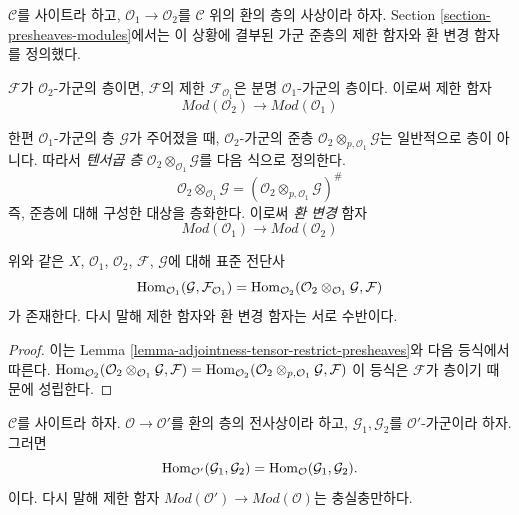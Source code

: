 \noindent
$\mathcal{C}$를 사이트라 하고, $\mathcal{O}_1 \to \mathcal{O}_2$를
$\mathcal{C}$ 위의 환의 층의 사상이라 하자. Section
\ref{section-presheaves-modules}에서는 이 상황에 결부된 가군 준층의 제한
함자와 환 변경 함자를 정의했다.

\medskip\noindent
$\mathcal{F}$가 $\mathcal{O}_2$-가군의 층이면, $\mathcal{F}$의 제한
$\mathcal{F}_{\mathcal{O}_1}$은 분명 $\mathcal{O}_1$-가군의 층이다.
이로써 제한 함자
$$
\textit{Mod}(\mathcal{O}_2)
\longrightarrow
\textit{Mod}(\mathcal{O}_1)
$$

\medskip\noindent
한편 $\mathcal{O}_1$-가군의 층 $\mathcal{G}$가 주어졌을 때,
$\mathcal{O}_2$-가군의 준층
$\mathcal{O}_2 \otimes_{p, \mathcal{O}_1} \mathcal{G}$는 일반적으로 층이
아니다. 따라서 {\it 텐서곱 층}
$\mathcal{O}_2 \otimes_{\mathcal{O}_1} \mathcal{G}$를 다음 식으로 정의한다.
$$
\mathcal{O}_2 \otimes_{\mathcal{O}_1} \mathcal{G}
=
(\mathcal{O}_2 \otimes_{p, \mathcal{O}_1} \mathcal{G})^\#
$$
즉, 준층에 대해 구성한 대상을 층화한다. 이로써 {\it 환 변경} 함자
$$
\textit{Mod}(\mathcal{O}_1)
\longrightarrow
\textit{Mod}(\mathcal{O}_2)
$$

\begin{lemma}
\label{lemma-adjointness-tensor-restrict}
위와 같은 $X$, $\mathcal{O}_1$, $\mathcal{O}_2$, $\mathcal{F}$,
$\mathcal{G}$에 대해 표준 전단사
$$
\mathop{\mathrm{Hom}}\nolimits_{\mathcal{O}_1}(\mathcal{G}, \mathcal{F}_{\mathcal{O}_1})
=
\mathop{\mathrm{Hom}}\nolimits_{\mathcal{O}_2}(
\mathcal{O}_2 \otimes_{\mathcal{O}_1} \mathcal{G},
\mathcal{F}
)
$$
가 존재한다. 다시 말해 제한 함자와 환 변경 함자는 서로 수반이다.
\end{lemma}

\begin{proof}
이는 Lemma \ref{lemma-adjointness-tensor-restrict-presheaves}와 다음 등식에서
따른다.
$\mathop{\mathrm{Hom}}\nolimits_{\mathcal{O}_2}(
\mathcal{O}_2 \otimes_{\mathcal{O}_1} \mathcal{G},
\mathcal{F}
)
=
\mathop{\mathrm{Hom}}\nolimits_{\mathcal{O}_2}(
\mathcal{O}_2 \otimes_{p, \mathcal{O}_1} \mathcal{G},
\mathcal{F}
)$
이 등식은 $\mathcal{F}$가 층이기 때문에 성립한다.
\end{proof}

\begin{lemma}
\label{lemma-epimorphism-modules}
$\mathcal{C}$를 사이트라 하자. $\mathcal{O} \to \mathcal{O}'$를 환의
층의 전사상이라 하고, $\mathcal{G}_1, \mathcal{G}_2$를
$\mathcal{O}'$-가군이라 하자. 그러면
$$
\mathop{\mathrm{Hom}}\nolimits_{\mathcal{O}'}(\mathcal{G}_1, \mathcal{G}_2) =
\mathop{\mathrm{Hom}}\nolimits_\mathcal{O}(\mathcal{G}_1, \mathcal{G}_2).
$$
이다. 다시 말해 제한 함자
$\textit{Mod}(\mathcal{O}') \to \textit{Mod}(\mathcal{O})$는 충실충만하다.
\end{lemma}

